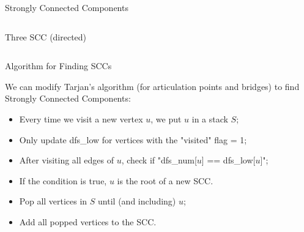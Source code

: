 \begin{frame}{Strongly Connected Components}
\begin{columns}[t]
\begin{exampleblock}{Three SCC (directed)}
\begin{center}
      \end{center}
      \vspace{0.1cm}
    \end{exampleblock}
  \end{columns}
\end{frame}

\begin{frame}{Algorithm for Finding SCCs}

  We can modify Tarjan's algorithm (for articulation points and bridges) to find Strongly Connected Components:\bigskip

  \begin{block}{}
  \begin{itemize}
    \item Every time we visit a new vertex $u$, we put $u$ in a stack $S$;
    \item Only update dfs\_low for vertices with the "visited" flag = 1;
    \item After visiting all edges of $u$, check if "dfs\_num[$u$] == dfs\_low[$u$]";
    \item If the condition is true, $u$ is the root of a new SCC.
    \item Pop all vertices in $S$ until (and including) $u$;
    \item Add all popped vertices to the SCC.
  \end{itemize}
  \end{block}
\end{frame}

